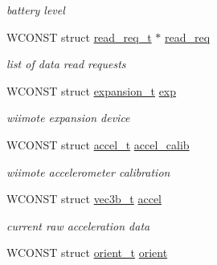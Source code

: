 \begin{DoxyCompactItemize}
\begin{DoxyCompactList}\small\item\em battery level \end{DoxyCompactList}\item 
\hypertarget{structwiimote__t_ac192abc14dc9355c9a161f9390a803ae}{W\-C\-O\-N\-S\-T struct \hyperlink{structread__req__t}{read\-\_\-req\-\_\-t} $\ast$ \hyperlink{structwiimote__t_ac192abc14dc9355c9a161f9390a803ae}{read\-\_\-req}}\label{structwiimote__t_ac192abc14dc9355c9a161f9390a803ae}

\begin{DoxyCompactList}\small\item\em list of data read requests \end{DoxyCompactList}\item 
\hypertarget{structwiimote__t_a50eb2a01ebd5e702c38890459070899e}{W\-C\-O\-N\-S\-T struct \hyperlink{structexpansion__t}{expansion\-\_\-t} \hyperlink{structwiimote__t_a50eb2a01ebd5e702c38890459070899e}{exp}}\label{structwiimote__t_a50eb2a01ebd5e702c38890459070899e}

\begin{DoxyCompactList}\small\item\em wiimote expansion device \end{DoxyCompactList}\item 
\hypertarget{structwiimote__t_a70eedb03dbfcfdc6e588110a680d177d}{W\-C\-O\-N\-S\-T struct \hyperlink{structaccel__t}{accel\-\_\-t} \hyperlink{structwiimote__t_a70eedb03dbfcfdc6e588110a680d177d}{accel\-\_\-calib}}\label{structwiimote__t_a70eedb03dbfcfdc6e588110a680d177d}

\begin{DoxyCompactList}\small\item\em wiimote accelerometer calibration \end{DoxyCompactList}\item 
\hypertarget{structwiimote__t_a479d5a06ad78fc175ef5876b9686867c}{W\-C\-O\-N\-S\-T struct \hyperlink{structvec3b__t}{vec3b\-\_\-t} \hyperlink{structwiimote__t_a479d5a06ad78fc175ef5876b9686867c}{accel}}\label{structwiimote__t_a479d5a06ad78fc175ef5876b9686867c}

\begin{DoxyCompactList}\small\item\em current raw acceleration data \end{DoxyCompactList}\item 
\hypertarget{structwiimote__t_a793dc495a39c2ae4a4a6cd875094070d}{W\-C\-O\-N\-S\-T struct \hyperlink{structorient__t}{orient\-\_\-t} \hyperlink{structwiimote__t_a793dc495a39c2ae4a4a6cd875094070d}{orient}}\label{structwiimote__t_a793dc495a39c2ae4a4a6cd875094070d}


\end{DoxyCompactItemize}
